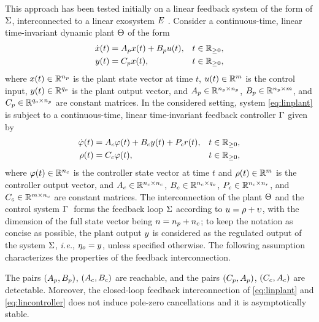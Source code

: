 This approach has been tested initially on a linear feedback system of the form of $\Sigma$, interconnected to a linear exosystem $E$ \cite{galeani_optimal_2023}. Consider a continuous-time, linear time-invariant dynamic plant $\Theta$ of the form
\begin{subequations}
	\label{eq:linplant}
	\begin{align}
		\dot{x}(t) & = A_px(t) + B_pu(t), & t\in\mathbb{R}_{\geq 0}, \\
		y(t)      & = C_px(t), & t\in\mathbb{R}_{\geq 0},
	\end{align}
\end{subequations}
where $x(t)\in\mathbb{R}^{n_p}$ is the plant state vector at time $t$, $u(t)\in\mathbb{R}^m$ is the control input, $y(t)\in\mathbb{R}^{q_o}$ is the plant output vector, and $A_p\in\mathbb{R}^{{n_p} \times {n_p}}$, $B_p\in\mathbb{R}^{{n_p} \times m}$, and $C_p\in\mathbb{R}^{{q_o} \times {n_p}}$ are constant matrices. In the considered setting, system \eqref{eq:linplant} is subject to a continuous-time, linear time-invariant feedback controller $\Gamma$ given by
\begin{subequations}
	\label{eq:lincontroller}
	\begin{align}
		\dot{\varphi}(t) & = A_c\varphi(t) + B_cy(t) + P_cr(t), & t\in\mathbb{R}_{\geq 0}, \\
		\rho(t)       & = C_c\varphi(t), & t\in\mathbb{R}_{\geq 0},
	\end{align}
\end{subequations}
where $\varphi(t)\in\mathbb{R}^{{n_c}}$ is the controller state vector at time $t$ and $\rho(t)\in\mathbb{R}^m$ is the controller output vector, and $A_c\in\mathbb{R}^{{n_c}\times{n_c}}$, $B_c\in\mathbb{R}^{{n_c}\times{q_o}}$, $P_c\in\mathbb{R}^{{n_c}\times{n_r}}$, and $C_c\in\mathbb{R}^{m\times{n_c}}$ are constant matrices. The interconnection of the plant $\Theta$ and the control system $\Gamma\;$ forms the feedback loop $\Sigma$ according to $u = \rho + \upsilon$, with the dimension of the full state vector being $n = {n_p} + {n_c}$; to keep the notation as concise as possible, the plant output $y$ is considered as the regulated output of the system $\Sigma$, \emph{i.e.}, $\eta_o = y$, unless specified otherwise. The following assumption characterizes the properties of the feedback interconnection.
\begin{assumption}
  \label{ass:lqrall_closedloop}
  The pairs $(A_p,B_p)$, $(A_c,B_c)$ are reachable, and the pairs $(C_p,A_p)$, $(C_c,A_c)$ are detectable. Moreover, the closed-loop feedback interconnection of \eqref{eq:linplant} and \eqref{eq:lincontroller} does not induce pole-zero cancellations and it is asymptotically stable.\closestatement
\end{assumption}

